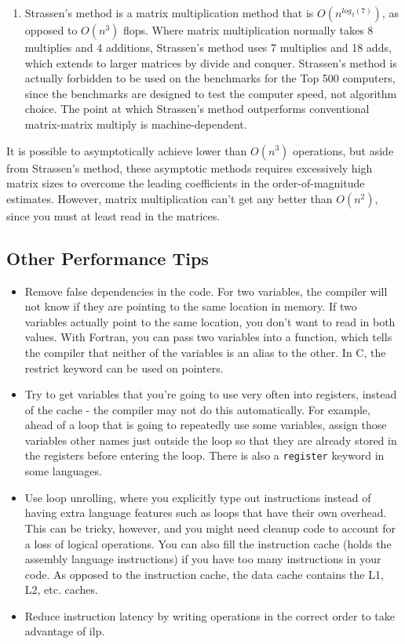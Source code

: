 \documentclass[10pt]{article}
\begin{document}
\begin{flushleft}
\begin{enumerate}
\item Strassen's method is a matrix multiplication method that is \(O(n^{log_2(7)})\), as opposed to \(O(n^3)\) flops. Where matrix multiplication normally takes 8 multiplies and 4 additions, Strassen's method uses 7 multiplies and 18 adds, which extends to larger matrices by divide and conquer. Strassen's method is actually forbidden to be used on the benchmarks for the Top 500 computers, since the benchmarks are designed to test the computer speed, not algorithm choice. The point at which Strassen's method outperforms conventional matrix-matrix multiply is machine-dependent.

\end{enumerate}

It is possible to asymptotically achieve lower than \(O(n^3)\) operations, but aside from Strassen's method, these asymptotic methods requires excessively high matrix sizes to overcome the leading coefficients in the order-of-magnitude estimates. However, matrix multiplication can't get any better than \(O(n^2)\), since you must at least read in the matrices.

\subsection{Other Performance Tips}

\begin{itemize}
\item Remove false dependencies in the code. For two variables, the compiler will not know if they are pointing to the same location in memory. If two variables actually point to the same location, you don't want to read in both values. With Fortran, you can pass two variables into a function, which tells the compiler that neither of the variables is an alias to the other. In C, the restrict keyword can be used on pointers.
\item Try to get variables that you're going to use very often into registers, instead of the cache - the compiler may not do this automatically. For example, ahead of a loop that is going to repeatedly use some variables, assign those variables other names just outside the loop so that they are already stored in the registers before entering the loop. There is also a {\tt register} keyword in some languages.
\item Use loop unrolling, where you explicitly type out instructions instead of having extra language features such as loops that have their own overhead. This can be tricky, however, and you might need cleanup code to account for a loss of logical operations. You can also fill the instruction cache (holds the assembly language instructions) if you have too many instructions in your code. As opposed to the instruction cache, the data cache contains the L1, L2, etc. caches.
\item Reduce instruction latency by writing operations in the correct order to take advantage of \gls{ilp}.
\end{itemize}


\end{flushleft}
\end{document}
